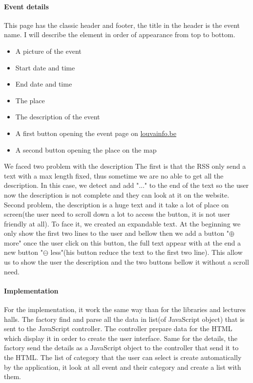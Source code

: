 \documentclass{eplmastersthesis}
\begin{document}
\paragraph{Event details} This page has the classic header and footer, the title in the header is the event name. I will describe the element in order of appearance from top to bottom.
\begin{itemize}
\item A picture of the event
\item Start date and time 
\item End date and time
\item The place
\item The description of the event
\item A first button opening the event page on \url{louvainfo.be}
\item A second button opening the place on the map
\end{itemize}
We faced two problem with the description The first is that the RSS only send a text with a max length fixed, thus sometime we are no able to get all the description. In this case, we detect and add "..." to the end of the text so the user now the description is not complete and they can look at it on the website. Second problem, the description is a huge text and it take a lot of place on screen(the user need to scroll down a lot to access the button, it is not user friendly at all). To face it, we created an expandable text. At the beginning we only show the first two lines to the user and bellow then we add a button "$\oplus$ more" once the user click on this button, the full text appear with at the end a new button "$\ominus$ less"(his button reduce the text to the first two line). This allow us to show the user the description and the two buttons bellow it without a scroll need.
\paragraph{Implementation}
For the implementation, it work the same way than for the libraries and lectures halls. The factory find and parse all the data in list(of JavaScript object) that is sent to the JavaScript controller. The controller prepare data for the HTML which display it in order to create the user interface. Same for the details, the factory send the details as a JavaScript object to the controller that send it to the HTML. The list of category that the user can select is create automatically by the application, it look at all event and their category and create a list with them. 
\end{document}
